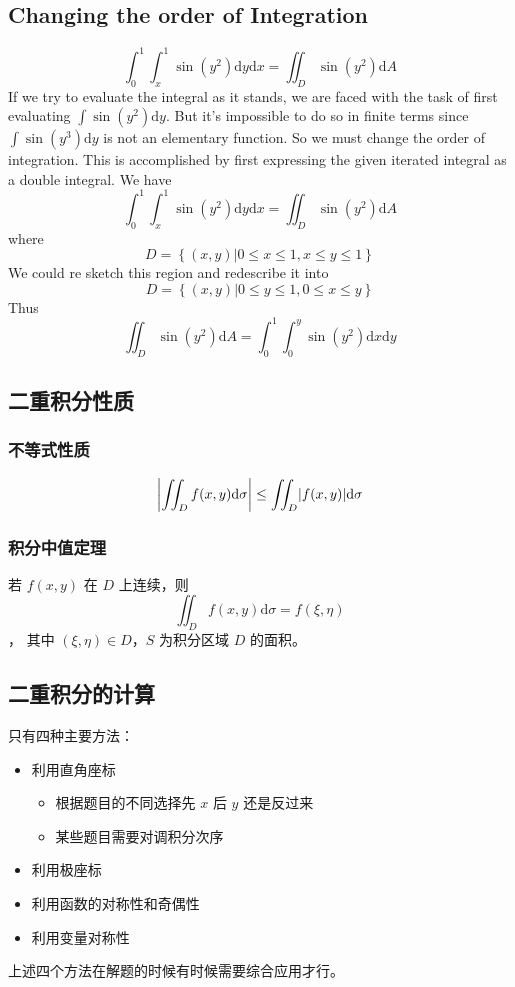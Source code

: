 \subsection{Changing the order of Integration}

\begin{example}
    \[
        \int_0^1\int_x^1 \sin(y^2) \mathrm{d}y \mathrm{d}x = \iint_D \sin(y^2) \mathrm dA
    \]
    If we try to evaluate the integral as it stands, we are faced with the task
    of first evaluating $\int \sin(y^2) \mathrm dy$.
    But it’s impossible to do so in finite terms since $\int \sin(y^3) \mathrm dy$ is not an elementary function.
    So we must
    change the order of integration. This is accomplished by first expressing the given
    iterated integral as a double integral. We have
    \[
        \int_0^1\int_x^1 \sin(y^2) \mathrm{d}y \mathrm{d}x = \iint_D \sin(y^2) \mathrm dA
    \]
    where
    \[
        D = \left\{ (x, y) | 0 \leq x \leq 1, x \leq y \leq 1 \right\}
    \]
    We could re sketch this region and redescribe it into
    \[
        D = \left\{ (x, y) | 0 \leq y \leq 1, 0 \leq x \leq y \right\}
    \]
    Thus 
    \[
        \iint_D \sin (y^2) \mathrm dA = \int_0^1 \int_0^y \sin (y^2) \mathrm dx \mathrm dy
    \]
\end{example}

\subsection{二重积分性质}

\subsubsection{不等式性质}

\[
    \abs*{\iint_D f(x, y) \mathrm d\sigma} \leq \iint_D \abs*{ f(x, y) } \mathrm d\sigma
\]

\subsubsection{积分中值定理}

若 $f(x,y)$ 在 $D$ 上连续，则 \[\iint_D f(x,y) \mathrm d\sigma = f(\xi, \eta)\]，
其中 $(\xi, \eta) \in D$，$S$ 为积分区域 $D$ 的面积。

\subsection{二重积分的计算} 

只有四种主要方法：
\begin{itemize}
    \item 利用直角座标
        \begin{itemize}
            \item 根据题目的不同选择先 $x$ 后 $y$ 还是反过来
            \item 某些题目需要对调积分次序
        \end{itemize}
    \item 利用极座标
    \item 利用函数的对称性和奇偶性
    \item 利用变量对称性
\end{itemize}
上述四个方法在解题的时候有时候需要综合应用才行。

